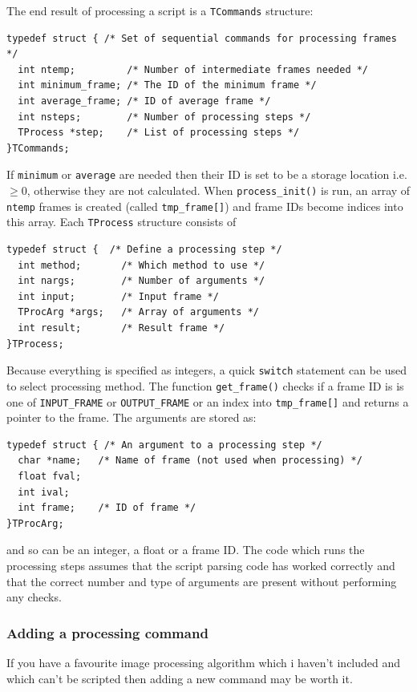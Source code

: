\documentclass[12pt, a4paper]{article}
\begin{document}
The end result of processing a script is a \texttt{TCommands} structure:
\begin{verbatim}
typedef struct { /* Set of sequential commands for processing frames */
  int ntemp;         /* Number of intermediate frames needed */
  int minimum_frame; /* The ID of the minimum frame */
  int average_frame; /* ID of average frame */
  int nsteps;        /* Number of processing steps */
  TProcess *step;    /* List of processing steps */
}TCommands;
\end{verbatim}
If \texttt{minimum} or \texttt{average} are needed then their ID is set to be
a storage location i.e. $\ge 0$, otherwise they are not calculated. When
\texttt{process\_init()} is run, an array of \texttt{ntemp} frames is created
(called \texttt{tmp\_frame[]}) and frame IDs become indices into this array.
Each \texttt{TProcess} structure consists of
\begin{verbatim}
typedef struct {  /* Define a processing step */
  int method;       /* Which method to use */
  int nargs;        /* Number of arguments */
  int input;        /* Input frame */
  TProcArg *args;   /* Array of arguments */
  int result;       /* Result frame */
}TProcess;
\end{verbatim}
Because everything is specified as integers, a quick \texttt{switch} statement
can be used to select processing method. The function \texttt{get\_frame()} 
checks if a frame ID is is one of \texttt{INPUT\_FRAME} or \texttt{OUTPUT\_FRAME}
or an index into \texttt{tmp\_frame[]} and returns a pointer to the frame.
The arguments are stored as:
\begin{verbatim}
typedef struct { /* An argument to a processing step */
  char *name;   /* Name of frame (not used when processing) */
  float fval;
  int ival;
  int frame;    /* ID of frame */
}TProcArg;
\end{verbatim}
and so can be an integer, a float or a frame ID. The code which runs
the processing steps assumes that the script parsing code has worked
correctly and that the correct number and type of arguments are present
without performing any checks.

\subsubsection{Adding a processing command}

If you have a favourite image processing algorithm which i haven't included
and which can't be scripted then adding a new command may be worth it.
\end{document}

